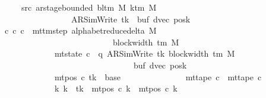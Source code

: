 \begin{isabellebody}
\ \ \ \ \ \ \ src{}{\isacharcolon}{\kern0pt}\ {\isachardoublequoteopen}ar{\isacharunderscore}{\kern0pt}stage{\isacharunderscore}{\kern0pt}bounded\ {\isacharparenleft}{\kern0pt}bl{\isacharunderscore}{\kern0pt}tm\ M{\isacharparenright}{\kern0pt}\ {\isacharparenleft}{\kern0pt}k{\isacharunderscore}{\kern0pt}tm\ M{\isacharparenright}{\kern0pt}\isanewline
\ \ \ \ \ \ \ \ \ \ \ \ \ \ \ \ \ \ \ {\isacharparenleft}{\kern0pt}AR{\isacharunderscore}{\kern0pt}SimWrite{\isacharcomma}{\kern0pt}\ tk{\isacharcomma}{\kern0pt}\ {}{\isacharcomma}{\kern0pt}\ buf{\isacharcomma}{\kern0pt}\ dvec{\isacharcomma}{\kern0pt}\ posk{\isacharparenright}{\kern0pt}{\isachardoublequoteclose}\isanewline
\ \ \ {\isachardoublequoteopen}{\isasymexists}c{\isacharprime}{\kern0pt}{\isachardot}{\kern0pt}\ {\isacharparenleft}{\kern0pt}c{}{\isacharcomma}{\kern0pt}\ c{\isacharprime}{\kern0pt}{\isacharparenright}{\kern0pt}\ {\isasymin}\ {\isacharparenleft}{\kern0pt}mttm{\isacharunderscore}{\kern0pt}step\ {\isacharparenleft}{\kern0pt}alphabet{\isacharunderscore}{\kern0pt}reduce{\isacharunderscore}{\kern0pt}delta\ M{\isacharparenright}{\kern0pt}{\isacharparenright}{\kern0pt}\isanewline
\ \ \ \ \ \ \ \ \ \ \ \ \ \ \ \ \ \ \ \ \ \ \ \ \ \ \ \ {\isacharcircum}{\kern0pt}{\isacharcircum}{\kern0pt}\ block{\isacharunderscore}{\kern0pt}width\ {\isacharparenleft}{\kern0pt}{\isasymGamma}{\isacharunderscore}{\kern0pt}tm\ M{\isacharparenright}{\kern0pt}\isanewline
\ \ \ \ \ \ \ \ \ \ \ \ \ \ {\isasymand}\ mt{\isacharunderscore}{\kern0pt}state\ c{\isacharprime}{\kern0pt}\ {\isacharequal}{\kern0pt}\ {\isacharparenleft}{\kern0pt}q{\isacharcomma}{\kern0pt}\ AR{\isacharunderscore}{\kern0pt}SimWrite{\isacharcomma}{\kern0pt}\ tk{\isacharcomma}{\kern0pt}\ block{\isacharunderscore}{\kern0pt}width\ {\isacharparenleft}{\kern0pt}{\isasymGamma}{\isacharunderscore}{\kern0pt}tm\ M{\isacharparenright}{\kern0pt}{\isacharcomma}{\kern0pt}\isanewline
\ \ \ \ \ \ \ \ \ \ \ \ \ \ \ \ \ \ \ \ \ \ \ \ \ \ \ \ \ \ \ \ \ \ buf{\isacharcomma}{\kern0pt}\ dvec{\isacharcomma}{\kern0pt}\ posk{\isacharparenright}{\kern0pt}\isanewline
\ \ \ \ \ \ \ \ \ \ \ \ \ \ {\isasymand}\ mt{\isacharunderscore}{\kern0pt}pos\ c{\isacharprime}{\kern0pt}\ tk\ {\isacharequal}{\kern0pt}\ base\isanewline
\ \ \ \ \ \ \ \ \ \ \ \ \ \ {\isasymand}\ mt{\isacharunderscore}{\kern0pt}tape\ c{\isacharprime}{\kern0pt}\ {\isacharequal}{\kern0pt}\ mt{\isacharunderscore}{\kern0pt}tape\ c{}\isanewline
\ \ \ \ \ \ \ \ \ \ \ \ \ \ {\isasymand}\ {\isacharparenleft}{\kern0pt}{\isasymforall}k{\isacharprime}{\kern0pt}{\isachardot}{\kern0pt}\ k{\isacharprime}{\kern0pt}\ {\isasymnoteq}\ tk\ {\isasymlongrightarrow}\ mt{\isacharunderscore}{\kern0pt}pos\ c{\isacharprime}{\kern0pt}\ k{\isacharprime}{\kern0pt}\ {\isacharequal}{\kern0pt}\ mt{\isacharunderscore}{\kern0pt}pos\ c{}\ k{\isacharprime}{\kern0pt}{\isacharparenright}{\kern0pt}{\isachardoublequoteclose}\isanewline

\end{isabellebody}
